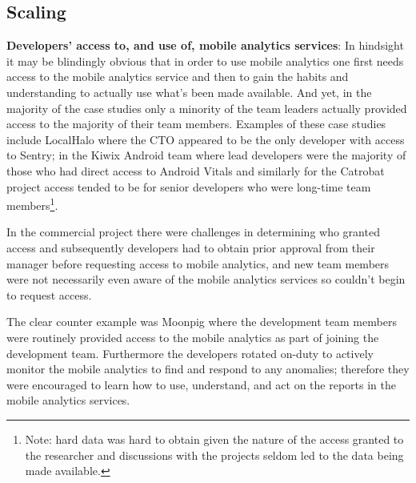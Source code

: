 \subsection{Scaling}
\textbf{Developers' access to, and use of, mobile analytics services}: 
In hindsight it may be blindingly obvious that in order to use mobile analytics one first needs access to the mobile analytics service and then to gain the habits and understanding to actually use what's been made available. And yet, in the majority of the case studies only a minority of the team leaders actually provided access to the majority of their team members. Examples of these case studies include LocalHalo where the CTO appeared to be the only developer with access to Sentry; in the Kiwix Android team where lead developers were the majority of those who had direct access to Android Vitals and similarly for the Catrobat project access tended to be for senior developers who were long-time team members\footnote{Note: hard data was hard to obtain given the nature of the access granted to the researcher and discussions with the projects seldom led to the data being made available.}.

In the commercial project there were challenges in determining who granted access and subsequently developers had to obtain prior approval from their manager before requesting access to mobile analytics, and new team members were not necessarily even aware of the mobile analytics services so couldn't begin to request access. 

The clear counter example was Moonpig where the development team members were routinely provided access to the mobile analytics as part of joining the development team. Furthermore the developers rotated on-duty to actively monitor the mobile analytics to find and respond to any anomalies; therefore they were encouraged to learn how to use, understand, and act on the reports in the mobile analytics services.

